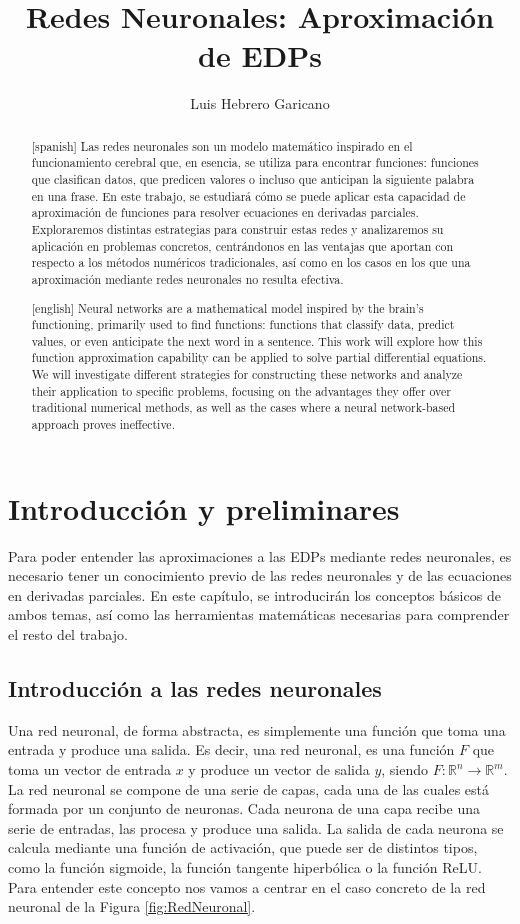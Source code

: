 \documentclass[a4paper,11pt,spanish, twoside, leqno]{tfg-uam}
\title{Redes Neuronales: Aproximación de EDPs}
\author{Luis Hebrero Garicano}
\theoremstyle{definition}
\begin{document}
\begin{abstract}[spanish]
Las redes neuronales son un modelo matemático inspirado en el funcionamiento cerebral que, en esencia, se utiliza para encontrar funciones: funciones que clasifican datos, que predicen valores o incluso que anticipan la siguiente palabra en una frase. En este trabajo, se estudiará cómo se puede aplicar esta capacidad de aproximación de funciones para resolver ecuaciones en derivadas parciales. Exploraremos distintas estrategias para construir estas redes y analizaremos su aplicación en problemas concretos, centrándonos en las ventajas que aportan con respecto a los métodos numéricos tradicionales, así como en los casos en los que una aproximación mediante redes neuronales no resulta efectiva.
\end{abstract}
\begin{abstract}[english]
Neural networks are a mathematical model inspired by the brain's functioning, primarily used to find functions: functions that classify data, predict values, or even anticipate the next word in a sentence. This work will explore how this function approximation capability can be applied to solve partial differential equations. We will investigate different strategies for constructing these networks and analyze their application to specific problems, focusing on the advantages they offer over traditional numerical methods, as well as the cases where a neural network-based approach proves ineffective.
\end{abstract}
\mainmatter


\chapter{Introducción y preliminares}\label{chap1}
\setcounter{page}{1}
Para poder entender las aproximaciones a las EDPs mediante redes neuronales, es necesario tener un conocimiento previo de las redes neuronales y de las ecuaciones en derivadas parciales. En este capítulo, se introducirán los conceptos básicos de ambos temas, así como las herramientas matemáticas necesarias para comprender el resto del trabajo.

\section{Introducción a las redes neuronales}\label{sec:RedesNeuronales}
Una red neuronal, de forma abstracta, es simplemente una función que toma una entrada y produce una salida. Es decir, una red neuronal, es una función $F$ que toma un vector de entrada $x$ y produce un vector de salida $y$, siendo $F: \mathbb{R}^n \rightarrow \mathbb{R}^m$. La red neuronal se compone de una serie de capas, cada una de las cuales está formada por un conjunto de neuronas. Cada neurona de una capa recibe una serie de entradas, las procesa y produce una salida. La salida de cada neurona se calcula mediante una función de activación, que puede ser de distintos tipos, como la función sigmoide, la función tangente hiperbólica o la función ReLU. Para entender este concepto nos vamos a centrar en el caso concreto de la red neuronal de la Figura \ref{fig:RedNeuronal}.
\end{document}
